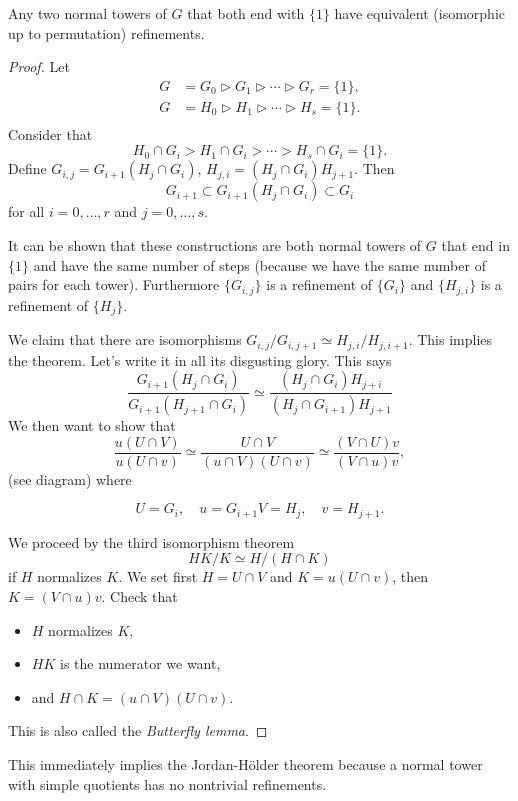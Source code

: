 \begin{theorem}[Schreier]
Any two normal towers of $G$ that both end with $\{1\}$ have
equivalent (isomorphic up to permutation) refinements.
\end{theorem}

\begin{proof}
Let
\begin{align*}
G &= G_0 \triangleright G_1 \triangleright
     \cdots \triangleright G_r = \{ 1\}, \\
G &= H_0 \triangleright H_1 \triangleright
     \cdots \triangleright H_s = \{ 1\}. \\
\end{align*}
Consider that
$$
H_0 \cap G_i > H_1 \cap G_i > \cdots > H_s \cap G_i = \{1\}.
$$
Define $G_{i,j} = G_{i+1}(H_j \cap G_i)$,
$H_{j,i} = (H_j \cap G_i)H_{j+1}$. Then
$$
G_{i+1} \subset G_{i+1} (H_j \cap G_i) \subset G_i
$$
for all $i=0,\dots,r$ and $j=0,\dots,s$.

It can be shown that these
constructions are both normal towers of $G$ that end in $\{1\}$ and
have the same number of steps (because we have the same number of
pairs for each tower). Furthermore $\{G_{i,j}\}$ is a refinement of
$\{G_i\}$ and $\{H_{j,i}\}$ is a refinement of $\{H_j\}$.

We claim that there are isomorphisms
$G_{i,j} / G_{i,j+1} \simeq H_{j,i} / H_{j, i+1}$. This implies the
theorem. Let's write it in all its disgusting glory. This says
$$
\frac{G_{i+1} (H_j \cap G_i)}{G_{i+1} (H_{j+1} \cap G_i)}
\simeq
\frac{(H_j \cap G_i) H_{j+i}}{(H_j \cap G_{i+1}) H_{j+1}}
$$
We then want to show that
$$
\frac{u(U \cap V)}{u(U \cap v)}
\simeq
\frac{U \cap V}{(u \cap V)(U \cap v)}
\simeq
\frac{(V \cap U)v}{(V \cap u)v},
$$
(see diagram) where

$$
U = G_i, \quad
u = G_{i+1}
V = H_j, \quad
v = H_{j+1}.
$$

We proceed by the third isomorphism theorem
$$
HK / K \simeq H / (H \cap K)
$$
if $H$ normalizes $K$. We set first
$H = U \cap V$ and $K = u(U \cap v)$, then
$K = (V \cap u)v$. Check that
\begin{itemize}
  \item{$H$ normalizes $K$,}
  \item{$HK$ is the numerator we want,}
  \item{and $H \cap K = (u \cap V)(U \cap v)$.}
\end{itemize}

This is also called the \emph{Butterfly lemma}.
\end{proof}

This immediately implies the Jordan-H\"older theorem because a normal
tower with simple quotients has no nontrivial refinements.